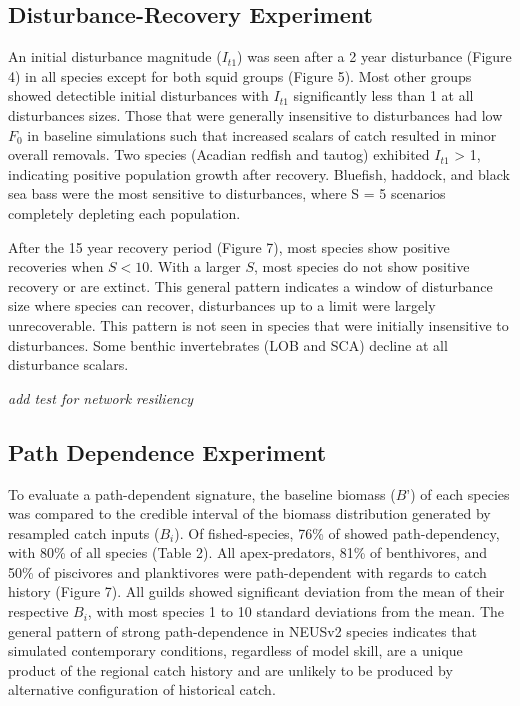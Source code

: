 \documentclass[
]{article}
\begin{document}
\subsection{Disturbance-Recovery Experiment}\label{disturbance-recovery-experiment-1}

An initial disturbance magnitude (\(I_{t1}\)) was seen after a 2 year disturbance (Figure 4) in all species except for both squid groups (Figure 5). Most other groups showed detectible initial disturbances with \(I_{t1}\) significantly less than 1 at all disturbances sizes. Those that were generally insensitive to disturbances had low \(F_0\) in baseline simulations such that increased scalars of catch resulted in minor overall removals. Two species (Acadian redfish and tautog) exhibited \(I_{t1}\) \textgreater{} 1, indicating positive population growth after recovery. Bluefish, haddock, and black sea bass were the most sensitive to disturbances, where S = 5 scenarios completely depleting each population.

After the 15 year recovery period (Figure 7), most species show positive recoveries when \(S < 10\). With a larger \(S\), most species do not show positive recovery or are extinct. This general pattern indicates a window of disturbance size where species can recover, disturbances up to a limit were largely unrecoverable. This pattern is not seen in species that were initially insensitive to disturbances. Some benthic invertebrates (LOB and SCA) decline at all disturbance scalars.

\emph{add test for network resiliency}

\subsection{Path Dependence Experiment}\label{path-dependence-experiment-1}

To evaluate a path-dependent signature, the baseline biomass (\(B’\)) of each species was compared to the credible interval of the biomass distribution generated by resampled catch inputs (\(B_i\)). Of fished-species, 76\% of showed path-dependency, with 80\% of all species (Table 2). All apex-predators, 81\% of benthivores, and 50\% of piscivores and planktivores were path-dependent with regards to catch history (Figure 7). All guilds showed significant deviation from the mean of their respective \(B_i\), with most species 1 to 10 standard deviations from the mean. The general pattern of strong path-dependence in NEUSv2 species indicates that simulated contemporary conditions, regardless of model skill, are a unique product of the regional catch history and are unlikely to be produced by alternative configuration of historical catch.
\end{document}
